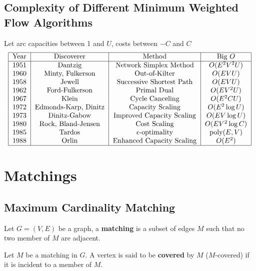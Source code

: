 		\section{Complexity of Different Minimum Weighted Flow Algorithms}
			Let arc capacities between 1 and $U$, costs between $-C$ and $C$
			\begin{align}
				\begin{tabular} {|c|c|c|c|}
					\hline
					Year & Discoverer & Method & Big $O$ \\
					\hline
					1951 & Dantzig & Network Simplex Method & $O(E^2V^2U)$ \\
					1960 & Minty, Fulkerson & Out-of-Kilter & $O(EVU)$\\
					1958 & Jewell & Successive Shortest Path & $O(EVU)$ \\
					1962 & Ford-Fulkerson & Primal Dual & $O(EV^2U)$ \\
					1967 & Klein & Cycle Canceling & $O(E^2CU)$ \\
					1972 & Edmonds-Karp, Dinitz & Capacity Scaling & $O(E^2 \log U)$\\
					1973 & Dinitz-Gabow & Improved Capacity Scaling & $O(EV\log U)$ \\
					1980 & Rock, Bland-Jensen & Cost Scaling & $O(EV^2\log C)$\\
					1985 & Tardos & $\epsilon$-optimality & poly($E,V$)\\
					1988 & Orlin & Enhanced Capacity Scaling & $O(E^2)$ \\
					\hline
				\end{tabular}
			\end{align}

	\chapter{Matchings}
		\section{Maximum Cardinality Matching}
			\begin{definition}[Matching]
				Let $G = (V, E)$ be a graph, a \textbf{matching} is a subset of edges $M$ such that no two member of $M$ are adjacent.
			\end{definition}

			\begin{definition}[Cover]
				Let $M$ be a matching in $G$. A vertex is said to be \textbf{covered} by $M$ ($M$-covered) if it is incident to a member of $M$.
			\end{definition}
			
